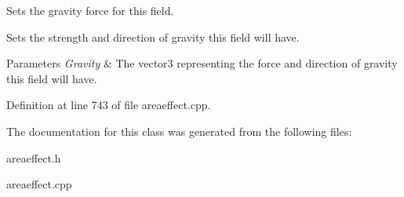 Sets the gravity force for this field. 

Sets the strength and direction of gravity this field will have. 
\begin{DoxyParams}{Parameters}
{\em Gravity} & The vector3 representing the force and direction of gravity this field will have. \\
\hline
\end{DoxyParams}


Definition at line 743 of file areaeffect.cpp.



The documentation for this class was generated from the following files:\begin{DoxyCompactItemize}
\item 
areaeffect.h\item 
areaeffect.cpp\end{DoxyCompactItemize}

